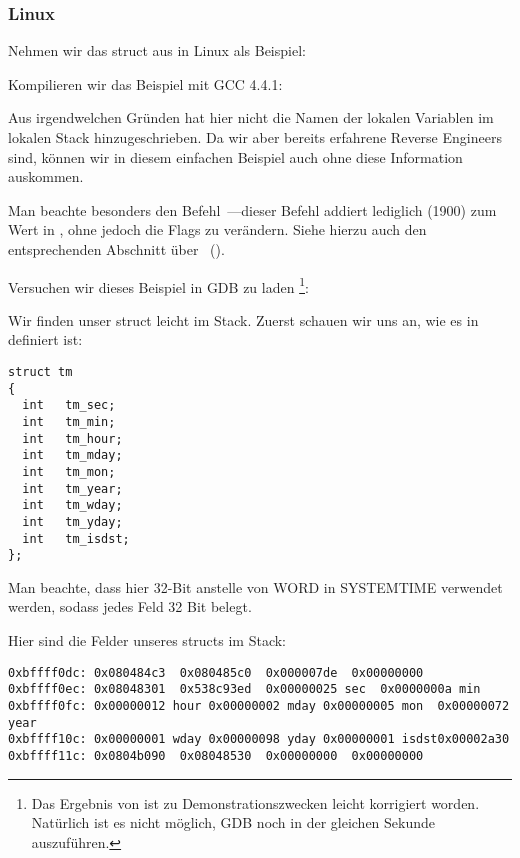 \subsubsection{Linux}
Nehmen wir das struct  aus  in Linux als Beispiel:



Kompilieren wir das Beispiel mit GCC 4.4.1:


Aus irgendwelchen Gründen hat \IDA hier nicht die Namen der lokalen Variablen im lokalen Stack hinzugeschrieben.
Da wir aber bereits erfahrene Reverse Engineers sind, können wir in diesem einfachen Beispiel auch ohne diese
Information auskommen.

Man beachte besonders den Befehl~---dieser Befehl addiert lediglich  (1900) zum Wert
in \EAX, ohne jedoch die Flags zu verändern. Siehe hierzu auch den entsprechenden Abschnitt über
\LEA{}~().

Versuchen wir dieses Beispiel in GDB zu laden
\footnote{Das Ergebnis von  ist zu Demonstrationszwecken leicht korrigiert worden. Natürlich ist es nicht
möglich, GDB noch in der gleichen Sekunde auszuführen.}:


Wir finden unser struct leicht im Stack.
Zuerst schauen wir uns an, wie es in  definiert ist:

\begin{lstlisting}[caption=time.h, label=struct_tm,style=customc]
struct tm
{
  int	tm_sec;
  int	tm_min;
  int	tm_hour;
  int	tm_mday;
  int	tm_mon;
  int	tm_year;
  int	tm_wday;
  int	tm_yday;
  int	tm_isdst;
};
\end{lstlisting}
Man beachte, dass hier 32-Bit \Tint anstelle von WORD in SYSTEMTIME verwendet werden, sodass jedes Feld 32 Bit belegt.

Hier sind die Felder unseres structs im Stack:

\begin{lstlisting}
0xbffff0dc:	0x080484c3	0x080485c0	0x000007de	0x00000000
0xbffff0ec:	0x08048301	0x538c93ed	0x00000025 sec	0x0000000a min
0xbffff0fc:	0x00000012 hour	0x00000002 mday	0x00000005 mon 	0x00000072 year
0xbffff10c:	0x00000001 wday	0x00000098 yday	0x00000001 isdst0x00002a30
0xbffff11c:	0x0804b090	0x08048530	0x00000000	0x00000000
\end{lstlisting}

